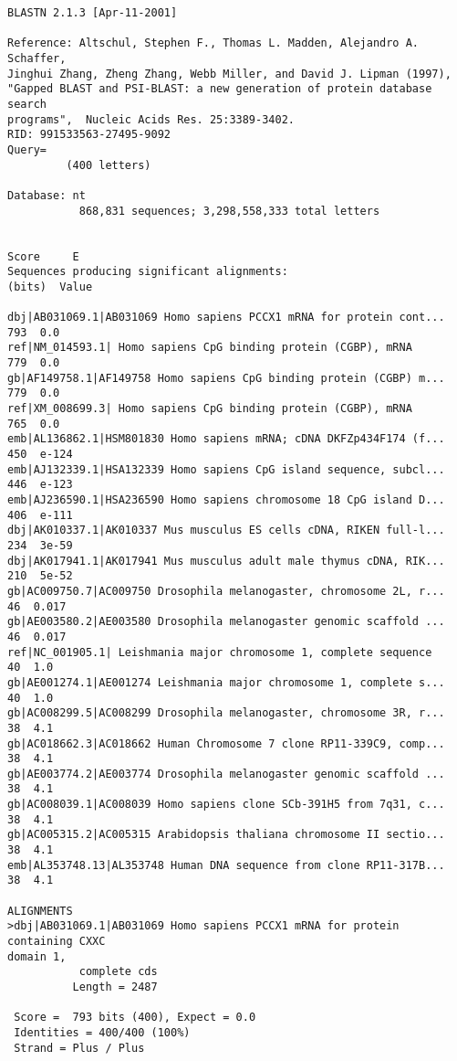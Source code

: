 \begin{lstlisting}
BLASTN 2.1.3 [Apr-11-2001]

Reference: Altschul, Stephen F., Thomas L. Madden, Alejandro A. Schaffer,
Jinghui Zhang, Zheng Zhang, Webb Miller, and David J. Lipman (1997),
"Gapped BLAST and PSI-BLAST: a new generation of protein database search
programs",  Nucleic Acids Res. 25:3389-3402.
RID: 991533563-27495-9092
Query=
         (400 letters)

Database: nt
           868,831 sequences; 3,298,558,333 total letters

                                                                   Score     E
Sequences producing significant alignments:                        (bits)  Value

dbj|AB031069.1|AB031069 Homo sapiens PCCX1 mRNA for protein cont...   793  0.0
ref|NM_014593.1| Homo sapiens CpG binding protein (CGBP), mRNA        779  0.0
gb|AF149758.1|AF149758 Homo sapiens CpG binding protein (CGBP) m...   779  0.0
ref|XM_008699.3| Homo sapiens CpG binding protein (CGBP), mRNA        765  0.0
emb|AL136862.1|HSM801830 Homo sapiens mRNA; cDNA DKFZp434F174 (f...   450  e-124
emb|AJ132339.1|HSA132339 Homo sapiens CpG island sequence, subcl...   446  e-123
emb|AJ236590.1|HSA236590 Homo sapiens chromosome 18 CpG island D...   406  e-111
dbj|AK010337.1|AK010337 Mus musculus ES cells cDNA, RIKEN full-l...   234  3e-59
dbj|AK017941.1|AK017941 Mus musculus adult male thymus cDNA, RIK...   210  5e-52
gb|AC009750.7|AC009750 Drosophila melanogaster, chromosome 2L, r...    46  0.017
gb|AE003580.2|AE003580 Drosophila melanogaster genomic scaffold ...    46  0.017
ref|NC_001905.1| Leishmania major chromosome 1, complete sequence      40  1.0
gb|AE001274.1|AE001274 Leishmania major chromosome 1, complete s...    40  1.0
gb|AC008299.5|AC008299 Drosophila melanogaster, chromosome 3R, r...    38  4.1
gb|AC018662.3|AC018662 Human Chromosome 7 clone RP11-339C9, comp...    38  4.1
gb|AE003774.2|AE003774 Drosophila melanogaster genomic scaffold ...    38  4.1
gb|AC008039.1|AC008039 Homo sapiens clone SCb-391H5 from 7q31, c...    38  4.1
gb|AC005315.2|AC005315 Arabidopsis thaliana chromosome II sectio...    38  4.1
emb|AL353748.13|AL353748 Human DNA sequence from clone RP11-317B...    38  4.1

ALIGNMENTS
>dbj|AB031069.1|AB031069 Homo sapiens PCCX1 mRNA for protein containing CXXC
domain 1,
           complete cds
          Length = 2487

 Score =  793 bits (400), Expect = 0.0
 Identities = 400/400 (100%)
 Strand = Plus / Plus


\end{lstlisting}
